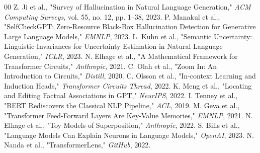 \begin{thebibliography}{00}
 Z. Ji et al., "Survey of Hallucination in Natural Language Generation," \textit{ACM Computing Surveys}, vol. 55, no. 12, pp. 1--38, 2023.
 P. Manakul et al., "SelfCheckGPT: Zero-Resource Black-Box Hallucination Detection for Generative Large Language Models," \textit{EMNLP}, 2023.
 L. Kuhn et al., "Semantic Uncertainty: Linguistic Invariances for Uncertainty Estimation in Natural Language Generation," \textit{ICLR}, 2023.
 N. Elhage et al., "A Mathematical Framework for Transformer Circuits," \textit{Anthropic}, 2021.
 C. Olah et al., "Zoom In: An Introduction to Circuits," \textit{Distill}, 2020.
 C. Olsson et al., "In-context Learning and Induction Heads," \textit{Transformer Circuits Thread}, 2022.
 K. Meng et al., "Locating and Editing Factual Associations in GPT," \textit{NeurIPS}, 2022.
 I. Tenney et al., "BERT Rediscovers the Classical NLP Pipeline," \textit{ACL}, 2019.
 M. Geva et al., "Transformer Feed-Forward Layers Are Key-Value Memories," \textit{EMNLP}, 2021.
 N. Elhage et al., "Toy Models of Superposition," \textit{Anthropic}, 2022.
 S. Bills et al., "Language Models Can Explain Neurons in Language Models," \textit{OpenAI}, 2023.
 N. Nanda et al., "TransformerLens," \textit{GitHub}, 2022.
\end{thebibliography}

